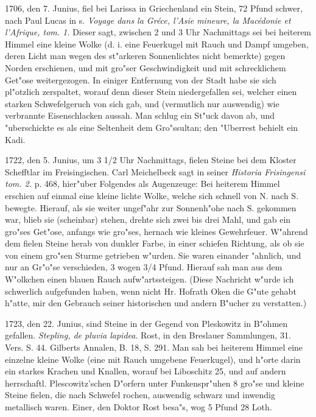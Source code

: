 \documentclass[a4paper, 11pt, oneside, polutonikogreek, german]{article}
\begin{document}
1706, den 7. Junius, fiel bei Larissa in Griechenland ein Stein, 72 Pfund schwer, nach Paul Lucas in s. \emph{Voyage dans la Gréce, l'Asie mineure, la Macédonie et l'Afrique, tom. 1.} Dieser sagt, zwischen 2 und 3 Uhr Nachmittags sei bei heiterem Himmel eine kleine Wolke (d. i. eine Feuerkugel mit Rauch und Dampf umgeben, deren Licht man wegen des st"arkeren Sonnenlichtes nicht bemerkte) gegen Norden erschienen, und mit gro"ser Geschwindigkeit und mit schrecklichem Get"ose weitergezogen. In einiger Entfernung von der Stadt habe sie sich pl"otzlich zerspaltet, worauf denn dieser Stein niedergefallen sei, welcher einen starken Schwefelgeruch von sich gab, und (vermutlich nur auswendig) wie verbrannte Eisenschlacken aussah. Man schlug ein St"uck davon ab, und "uberschickte es als eine Seltenheit dem Gro"ssultan; den "Uberrest behielt ein Kadi.

1722, den 5. Junius, um 3 1/2 Uhr Nachmittags, fielen Steine bei dem Kloster Schefftlar im Freisingischen. Carl Meichelbeck sagt in seiner \emph{Historia Frisingensi tom. 2.} p. 468, hier"uber Folgendes als Augenzeuge: Bei heiterem Himmel erschien auf einmal eine kleine lichte Wolke, welche sich schnell von N. nach S. bewegte. Hierauf, als sie weiter ungef"ahr zur Sonnenh"ohe nach S. gekommen war, blieb sie (scheinbar) stehen, drehte sich zwei bis drei Mahl, und gab ein gro"ses Get"ose, anfangs wie gro"ses, hernach wie kleines Gewehrfeuer. W"ahrend dem fielen Steine herab von dunkler Farbe, in einer schiefen Richtung, als ob sie von einem gro"sen Sturme getrieben w"urden. Sie waren einander "ahnlich, und nur an Gr"o"se verschieden, 3 wogen 3/4 Pfund. Hierauf sah man aus dem W"olkchen einen blauen Rauch aufw"artssteigen. (Diese Nachricht w"urde ich schwerlich aufgefunden haben, wenn nicht Hr. Hofrath Oken die G"ute gehabt h"atte, mir den Gebrauch seiner historischen und andern B"ucher zu verstatten.)

1723, den 22. Junius, sind Steine in der Gegend von Pleskowitz in B"ohmen gefallen. \emph{Stepling, de pluvia lapidea}. Rost, in den Breslauer Sammlungen, 31. Vers. S. 44. Gilberts Annalen, B. 18, S. 291. Man sah bei heiterem Himmel eine einzelne kleine Wolke (eine mit Rauch umgebene Feuerkugel), und h"orte darin ein starkes Krachen und Knallen, worauf bei Liboschitz 25, und auf andern herrschaftl. Plescowitz'schen D"orfern unter Funkenspr"uhen 8 gro"se und kleine Steine fielen, die nach Schwefel rochen, auswendig schwarz und inwendig metallisch waren. Einer, den Doktor Rost besa"s, wog 5 Pfund 28 Loth.
\end{document}

